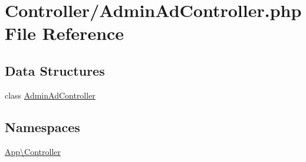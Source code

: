 \hypertarget{_admin_ad_controller_8php}{}\section{Controller/\+Admin\+Ad\+Controller.php File Reference}
\label{_admin_ad_controller_8php}
\subsection*{Data Structures}
\begin{DoxyCompactItemize}
\item 
class \mbox{\hyperlink{class_app_1_1_controller_1_1_admin_ad_controller}{Admin\+Ad\+Controller}}
\end{DoxyCompactItemize}
\subsection*{Namespaces}
\begin{DoxyCompactItemize}
\item 
 \mbox{\hyperlink{namespace_app_1_1_controller}{App\textbackslash{}\+Controller}}
\end{DoxyCompactItemize}
